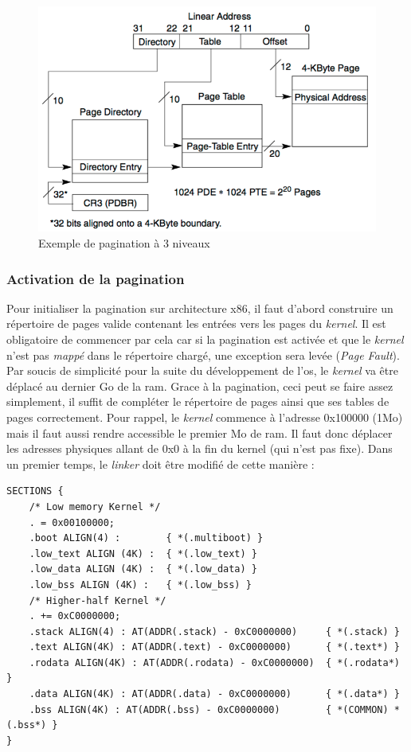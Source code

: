 \begin{figure}[!h]
  \centering
  \includegraphics[scale=0.85]{images/paging3.png}
  \caption{Exemple de pagination à 3 niveaux}
  \label{paging3}
\end{figure}


\subsubsection{Activation de la pagination}
\label{activate_paging}
Pour initialiser la pagination sur architecture x86, il faut d'abord construire
un répertoire de pages valide contenant les entrées vers les pages du \textit{kernel}.
Il est obligatoire de commencer par cela car si la pagination est activée et que
le \textit{kernel} n'est pas \textit{mappé} dans le répertoire chargé, une exception
sera levée (\textit{Page Fault}). Par soucis de simplicité pour la suite du développement
de l'\acrshort{os}, le \textit{kernel} va être déplacé au dernier Go de la \acrshort{ram}.
Grace à la pagination, ceci peut se faire assez simplement, il suffit de compléter
le répertoire de pages ainsi que ses tables de pages correctement. Pour rappel,
le \textit{kernel} commence à l'adresse 0x100000 (1Mo) mais il faut aussi rendre
accessible le premier Mo de \acrshort{ram}. Il faut donc déplacer les adresses physiques
allant de 0x0 à la fin du kernel (qui n'est pas fixe). Dans un premier temps, le
\textit{linker} doit être modifié de cette manière :

\begin{verbatim}
SECTIONS {
    /* Low memory Kernel */
    . = 0x00100000;
    .boot ALIGN(4) :        { *(.multiboot) }
    .low_text ALIGN (4K) :  { *(.low_text) }
    .low_data ALIGN (4K) :  { *(.low_data) }
    .low_bss ALIGN (4K) :   { *(.low_bss) }
    /* Higher-half Kernel */
    . += 0xC0000000;
    .stack ALIGN(4) : AT(ADDR(.stack) - 0xC0000000)     { *(.stack) }
    .text ALIGN(4K) : AT(ADDR(.text) - 0xC0000000)      { *(.text*) }
    .rodata ALIGN(4K) : AT(ADDR(.rodata) - 0xC0000000)  { *(.rodata*) }
    .data ALIGN(4K) : AT(ADDR(.data) - 0xC0000000)      { *(.data*) }
    .bss ALIGN(4K) : AT(ADDR(.bss) - 0xC0000000)        { *(COMMON) *(.bss*) }
}
\end{verbatim}

